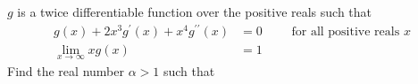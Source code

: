 $g$ is a twice differentiable function over the positive reals such that \begin{align}g(x)+2x^3g^\prime(x)+x^4g^{\prime\prime}(x)&= 0 \qquad\text{  for all positive reals } x\\\lim_{x\to\infty}xg(x)&=1\end{align}
Find the real number $\alpha>1$ such that 
